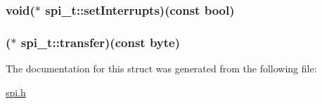 \hypertarget{a00008_af944febbd807cf8744ee0637754a7c8b}{
\subsubsection[{set\-Interrupts}]{\setlength{\rightskip}{0pt plus 5cm}void($\ast$ spi\-\_\-t\-::set\-Interrupts)(const bool)}}\label{a00008_af944febbd807cf8744ee0637754a7c8b}
\hypertarget{a00008_a0720e9cd5a2231ab20699f520d4148b3}{
\subsubsection[{transfer}]{($\ast$ spi\-\_\-t\-::transfer)(const {\bf byte})}}\label{a00008_a0720e9cd5a2231ab20699f520d4148b3}


The documentation for this struct was generated from the following file\-:\begin{DoxyCompactItemize}
\item 
\hyperlink{a00015}{spi.\-h}\end{DoxyCompactItemize}
